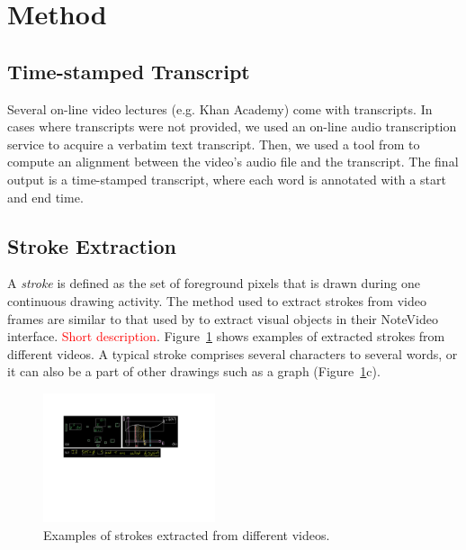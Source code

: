 \section{Method}
\subsection{Time-stamped Transcript}
Several on-line video lectures (e.g. Khan Academy) come with transcripts. In cases where transcripts were not provided, we used an on-line audio transcription service to acquire a verbatim text transcript. Then, we used a tool from \cite{rubin2013content} to compute an alignment between the video's audio file and the transcript. The final output is a time-stamped transcript, where each word is annotated with a start and end time.

\subsection{Stroke Extraction}
A \textit{stroke} is defined as the set of foreground pixels that is drawn during one continuous drawing activity. The method used to extract strokes from video frames are similar to that used by \cite{monserrat2013notevideo} to extract visual objects in their NoteVideo interface. \textcolor{red}{Short description}. Figure~\ref{Fig:stroke_examples} shows examples of extracted strokes from different videos. A typical stroke comprises several characters to several words, or it can also be a part of other drawings such as a graph (Figure~\ref{Fig:stroke_examples}c).  

\begin{figure}[h]
       \centering
        \includegraphics[width=0.45\textwidth, clip=true]{images/example_strokes}
        \caption{Examples of strokes extracted from different videos.}
        \label{Fig:stroke_examples}
\end{figure}


